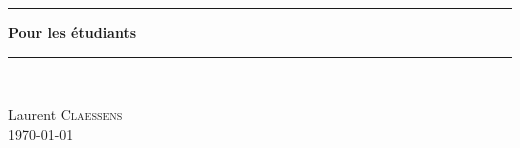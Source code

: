 
\thispagestyle{empty}
\begin{center}
  \begin{minipage}{15cm}
    \hrule\par
    \vspace{2mm}
    \begin{center}
    \Huge \bfseries  Pour les étudiants \par
    \end{center}
    \hrule\par
  \end{minipage}\\
\end{center}

\vspace{2cm}

\begin{center}
    Laurent \textsc{Claessens}\\
    \today
\end{center}

\vfill

\LogoEtLicence

\clearpage

\thispagestyle{empty}

